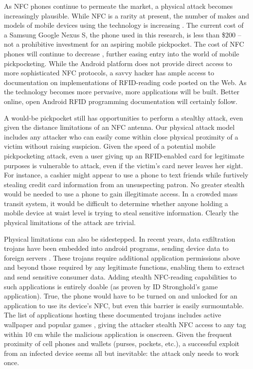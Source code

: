 \documentclass{IEEEtran}
\begin{document}
As NFC phones continue to permeate the market, a physical attack becomes increasingly plausible.  While NFC is a rarity at present, the number of makes and models of mobile devices using the technology is increasing \cite{list-of-nfc-phones}.  The current cost of a Samsung Google Nexus S, the phone used in this research, is less than \$200 -- not a prohibitive investment for an aspiring mobile pickpocket.  The cost of NFC phones will continue to decrease \cite{ds-nfc-enabling-technology}, further easing entry into the world of mobile pickpocketing.  While the Android platform does not provide direct access to more sophisticated NFC protocols, a savvy hacker has ample access to documentation on implementations of RFID-reading code posted on the Web.  As the technology becomes more pervasive, more applications will be built.  Better online, open Android RFID programming documentation will certainly follow.

A would-be pickpocket still has opportunities to perform a stealthy attack, even given the distance limitations of an NFC antenna.  Our physical attack model includes any attacker who can easily come within close physical proximity of a victim without raising suspicion.  Given the speed of a potential mobile pickpocketing attack, even a user giving up an RFID-enabled card for legitimate purposes is vulnerable to attack, even if the victim's card never leaves her sight.  For instance, a cashier might appear to use a phone to text friends while furtively stealing credit card information from an unsuspecting patron.  No greater stealth would be needed to use a phone to gain illegitimate access.  In a crowded mass transit system, it would be difficult to determine whether anyone holding a mobile device at waist level is trying to steal sensitive information.  Clearly the physical limitations of the attack are trivial.

Physical limitations can also be sidestepped.  In recent years, data exfiltration trojans have been embedded into android programs, sending device data to foreign servers \cite{droiddreamlight}.  These trojans require additional application permissions above and beyond those required by any legitimate functions, enabling them to extract and send sensitive consumer data.  Adding stealth NFC-reading capabilities to such applications is entirely doable (as proven by ID Stronghold's game application).  True, the phone would have to be turned on and unlocked for an application to use its device's NFC, but even this barrier is easily surmountable.  The list of applications hosting these documented trojans includes active wallpaper and popular games \cite{venturebeat-malicious-wallpaper}, giving the attacker stealth NFC access to any tag within 10 cm while the malicious application is onscreen.  Given the frequent proximity of cell phones and wallets (purses, pockets, etc.), a successful exploit from an infected device seems all but inevitable: the attack only needs to work once.  
\end{document}
